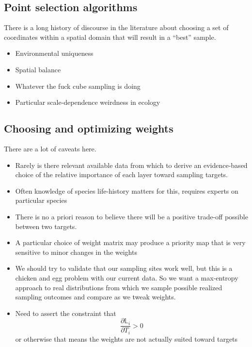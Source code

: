 \documentclass[10pt,oneside]{article}
\begin{document}
\hypertarget{point-selection-algorithms}{%
\subsection{Point selection
algorithms}\label{point-selection-algorithms}}

There is a long history of discourse in the literature about choosing a
set of coordinates within a spatial domain that will result in a
``best'' sample.

\begin{itemize}
\tightlist
\item
  Environmental uniqueness
\item
  Spatial balance
\item
  Whatever the fuck cube sampling is doing
\item
  Particular scale-dependence weirdness in ecology
\end{itemize}

\hypertarget{choosing-and-optimizing-weights}{%
\subsection{Choosing and optimizing
weights}\label{choosing-and-optimizing-weights}}

There are a lot of caveats here.

\begin{itemize}
\tightlist
\item
  Rarely is there relevant available data from which to derive an
  evidence-based choice of the relative importance of each layer toward
  sampling targets.
\item
  Often knowledge of species life-history matters for this, requires
  experts on particular species
\item
  There is no a priori reason to believe there will be a positive
  trade-off possible between two targets.
\item
  A particular choice of weight matrix may produce a priority map that
  is very sensitive to minor changes in the weights
\item
  We should try to validate that our sampling sites work well, but this
  is a chicken and egg problem with our current data. So we want a
  max-entropy approach to real distributions from which we sample
  possible realized sampling outcomes and compare as we tweak weights.
\item
  Need to assert the constraint that
  \[\frac{\partial \mathbb{L}_i}{\partial
  T_i}>0\] or otherwise that means the weights are not actually suited
  toward targets
\end{itemize}
\end{document}
